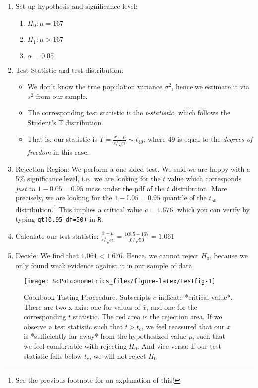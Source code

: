 \documentclass[]{book}
\providecommand{\tightlist}{%
  \setlength{\itemsep}{0pt}\setlength{\parskip}{0pt}}
\let\rmarkdownfootnote\footnote%
\def\footnote{\protect\rmarkdownfootnote}
\begin{document}
\begin{enumerate}
\def\labelenumi{\arabic{enumi}.}
\tightlist
\item
  Set up hypothesis and significance level:

  \begin{enumerate}
  \def\labelenumii{\arabic{enumii}.}
  \tightlist
  \item
    \(H_0: \mu = 167\)
  \item
    \(H_1: \mu > 167\)
  \item
    \(\alpha = 0.05\)
  \end{enumerate}
\item
  Test Statistic and test distribution:

  \begin{itemize}
  \tightlist
  \item
    We don't know the true population variance \(\sigma^2\), hence we
    estimate it via \(s^2\) from our sample.
  \item
    The corresponding test statistic is the \emph{t-statistic}, which
    follows the
    \href{https://en.wikipedia.org/wiki/Student's_t-distribution}{Student's
    T} distribution.
  \item
    That is, our statistic is
    \(T=\frac{\bar{x} - \mu}{s/\sqrt{n}} \sim t_{49}\), where 49 is
    equal to the \emph{degrees of freedom} in this case.
  \end{itemize}
\item
  Rejection Region: We perform a one-sided test. We said we are happy
  with a 5\% significance level, i.e.~we are looking for the \(t\) value
  which corresponds \emph{just} to \(1-0.05 = 0.95\) mass under the pdf
  of the \(t\) distribution. More precisely, we are looking for the
  \(1-0.05 = 0.95\) quantile of the \(t_{50}\) distribution.\footnote{See
    the previous footnote for an explanation of this!} This implies a
  critical value \(c = 1.676\), which you can verify by typing
  \texttt{qt(0.95,df=50)} in \texttt{R}.
\item
  Calculate our test statistic:
  \(\frac{\bar{x} - \mu}{s/\sqrt{n}} = \frac{168.5 - 167}{10/\sqrt{50}} = 1.061\)
\item
  Decide: We find that \(1.061 < 1.676\). Hence, we cannot reject
  \(H_0\), because we only found weak evidence against it in our sample
  of data.
\end{enumerate}

\begin{figure}

{\centering \texttt{[image: ScPoEconometrics\_files/figure-latex/testfig-1]} 

}

\caption{Cookbook Testing Proceedure. Subscripts $c$ indicate *critical value*. There are two x-axis: one for values of $\bar{x}$, and one for the corresponding $t$ statistic. The red area is the rejection area. If we observe a test statistic such that $t>t_c$, we feel reassured that our $\bar{x}$ is *sufficiently far away* from the hypothesized value $\mu$, such that we feel comfortable with rejecting $H_0$. And vice versa: If our test statistic falls below $t_c$, we will not reject $H_0$}\label{fig:testfig}
\end{figure}
\end{document}
